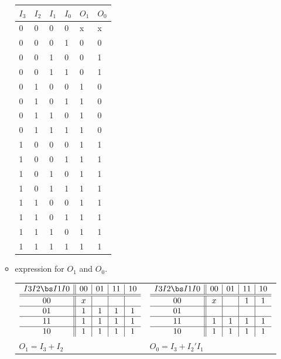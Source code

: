 \begin{enumerate}
\begin{itemize}
\begin{solution}{
	\begin{tabular}{l|l|l|l||l|l}
	$I_3$ & $I_2$ & $I_1$ & $I_0$ & $O_1$ & $O_0$ \\ \hline
	0 & 0 & 0 & 0 &  x & x \\ \hline
	0 & 0 & 0 & 1 &  0 & 0 \\ \hline
	0 & 0 & 1 & 0 &  0 & 1 \\ \hline
	0 & 0 & 1 & 1 &  0 & 1 \\ \hline
	0 & 1 & 0 & 0 &  1 & 0 \\ \hline
	0 & 1 & 0 & 1 &  1 & 0 \\ \hline
	0 & 1 & 1 & 0 &  1 & 0 \\ \hline
	0 & 1 & 1 & 1 &  1 & 0 \\ \hline
	1 & 0 & 0 & 0 &  1 & 1 \\ \hline
	1 & 0 & 0 & 1 &  1 & 1 \\ \hline
	1 & 0 & 1 & 0 &  1 & 1 \\ \hline
	1 & 0 & 1 & 1 &  1 & 1 \\ \hline
	1 & 1 & 0 & 0 &  1 & 1 \\ \hline
	1 & 1 & 0 & 1 &  1 & 1 \\ \hline
	1 & 1 & 1 & 0 &  1 & 1 \\ \hline
	1 & 1 & 1 & 1 &  1 & 1 \\ 
	\end{tabular}
} \end{solution}
\item \SOPmin expression for $O_1$ and $O_0$.

\begin{solution}{
\begin{tabular}{ll}
$ \begin{array} {c||c|c|c|c}
 I3 I2 \bs I1 I0 & 00 & 01 & 11 & 10 \\ \hline \hline
       00        & x  &    &    &    \\ \hline
       01        & 1  & 1  & 1  & 1  \\ \hline
       11        & 1  & 1  & 1  & 1  \\ \hline
       10        & 1  & 1  & 1  & 1  \\
\end{array} $ & 
$ \begin{array} {c||c|c|c|c}
 I3 I2 \bs I1 I0 & 00 & 01 & 11 & 10 \\ \hline \hline
       00        & x  &    & 1  & 1  \\ \hline
       01        &    &    &    &    \\ \hline
       11        & 1  & 1  & 1  & 1  \\ \hline
       10        & 1  & 1  & 1  & 1  \\
\end{array} $ \\
$O_1 = I_3 + I_2$ & $O_0=I_3 + I_2'I_1$ \\
\end{tabular}
} \end{solution}
\end{itemize}


\end{enumerate}
